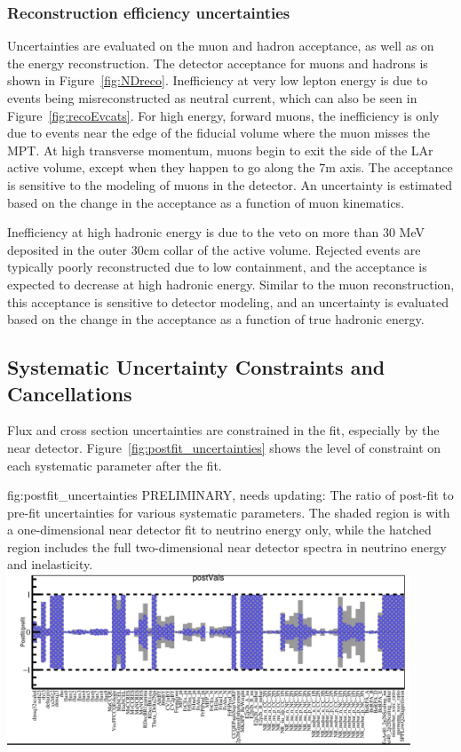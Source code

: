 \subsubsection{Reconstruction efficiency uncertainties}

Uncertainties are evaluated on the muon and hadron acceptance, as well as on the energy reconstruction. The detector acceptance for muons and hadrons is shown in Figure~\ref{fig:NDreco}. Inefficiency at very low lepton energy is due to events being misreconstructed as neutral current, which can also be seen in Figure~\ref{fig:recoEvcats}. For high energy, forward muons, the inefficiency is only due to events near the edge of the fiducial volume where the muon misses the MPT. At high transverse momentum, muons begin to exit the side of the LAr active volume, except when they happen to go along the 7m axis. The acceptance is sensitive to the modeling of muons in the detector. An uncertainty is estimated based on the change in the acceptance as a function of muon kinematics.

Inefficiency at high hadronic energy is due to the veto on more than 30 MeV deposited in the outer 30cm collar of the active volume. Rejected events are typically poorly reconstructed due to low containment, and the acceptance is expected to decrease at high hadronic energy. Similar to the muon reconstruction, this acceptance is sensitive to detector modeling, and an uncertainty is evaluated based on the change in the acceptance as a function of true hadronic energy.

\subsection{Systematic Uncertainty Constraints and Cancellations}

Flux and cross section uncertainties are constrained in the fit, especially by the near detector. Figure~\ref{fig:postfit_uncertainties} shows the level of constraint on each systematic parameter after the fit.

\begin{dunefigure}{fig:postfit_uncertainties}
{PRELIMINARY, needs updating: The ratio of post-fit to pre-fit uncertainties for various systematic parameters. The shaded region is with a one-dimensional near detector fit to neutrino energy only, while the hatched region includes the full two-dimensional near detector spectra in neutrino energy and inelasticity.}
  \includegraphics[width=0.9\textwidth]{graphics/postfit_errors.png}
\end{dunefigure}

